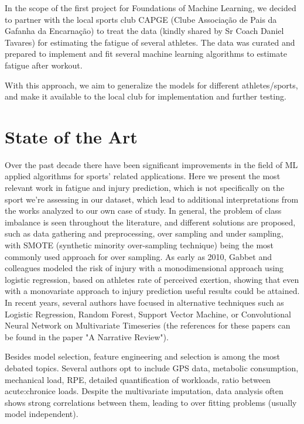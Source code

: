 \documentclass[conference]{IEEEtran}
\begin{document}
In the scope of the first project for Foundations of Machine Learning, we decided to partner with the local sports club CAPGE (Clube Associação de Pais da Gafanha da Encarnação) to treat the data (kindly shared by Sr Coach Daniel Tavares) for estimating the fatigue of several athletes. The data was curated and prepared to implement and fit several machine learning algorithms to estimate fatigue after workout.

With this approach, we aim to generalize the models for different athletes/sports, and make it available to the local club for implementation and further testing. 



\section{State of the Art}

Over the past decade there have been significant improvements in the field of ML applied algorithms for sports' related applications. Here we present the most relevant work in fatigue and injury prediction, which is not specifically on the sport we're assessing in our dataset, which lead to additional interpretations from the works analyzed to our own case of study. In general, the problem of class imbalance is seen throughout the literature, and different solutions are proposed, such as data gathering and preprocessing, over sampling and under sampling, with SMOTE (synthetic minority over-sampling technique) being the most commonly used approach for over sampling. As early as 2010, Gabbet and colleagues modeled the risk of injury with a monodimensional approach using logistic regression, based on athletes rate of perceived exertion, showing that even with a monovariate approach to injury prediction useful results could be attained. In recent years, several authors have focused in alternative techniques such as Logistic Regression, Random Forest, Support Vector Machine, or Convolutional Neural Network on Multivariate Timeseries (the references for these papers can be found in the paper "A Narrative Review").

Besides model selection, feature engineering and selection is among the most debated topics. Several authors opt to include GPS data, metabolic consumption, mechanical load, RPE, detailed quantification of workloads, ratio between acute:chronice loads. Despite the multivariate imputation, data analysis often shows strong correlations between them, leading to over fitting problems (usually model independent).
\end{document}
